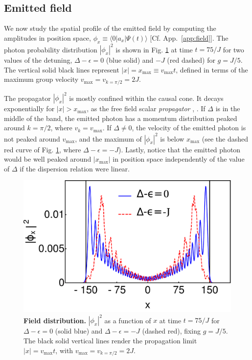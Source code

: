 \documentclass[aps,pra,twocolumn,floatfix,superscriptaddress]{revtex4-1}%
\begin{document}

\subsection{Emitted field}

We now study the spatial profile of the emitted field by computing the amplitudes in position space, $\phi_x\equiv \langle 0|a_x|\Psi(t)\rangle$ [Cf. App.\ \ref{app:field}]. The photon probability distribution $|\phi_x|^2$ is shown in Fig. \ref{fig:w_n} at time $t=75/J$ for two values of the detuning, $\Delta-\epsilon=0$ (blue solid) and $-J$ (red dashed) for $g=J/5$. The vertical solid black lines represent $|x|=x_\text{max}\equiv v_\text{max}t$, defined in terms of the maximum group velocity $v_\text{max}= v_{k=\pi/2}=2J$. 

The propagator $|\phi_x|^2$ is mostly confined within the causal cone. It decays exponentially for $|x|>x_\text{max}$, as the free field scalar {\it propagator} \cite[Sect. 4.5]{Greiner-fq}, \cite[Sect. 2]{Peskin}. If $\Delta$ is in the middle of the band, the emitted photon has a momentum distribution peaked around $k=\pi/2$, where $v_k=v_\text{max}$. {\color{blue}If $\Delta\neq 0$, the velocity of the emitted photon is not peaked around $v_\text{max}$, and the maximum of $|\phi_x|^2$ is below $x_\text{max}$ (see the dashed red curve of Fig. \ref{fig:w_n}, where $\Delta-\epsilon=-J$)}. {\color{blue}Lastly, notice that the emitted photon would be well peaked around $|x_\text{max}|$ in position space independently of the value of $\Delta$ if the dispersion relation were linear.}


\begin{figure}[thb!]
\includegraphics[width=1.0\columnwidth]{wx_g_0_2_Delta_0_-1.pdf}
\caption{{\bf Field distribution.} $|\phi_x|^2$ as a function of $x$ at time $t=75/J$ for $\Delta-\epsilon=0$ (solid blue) and $\Delta-\epsilon=-J$ (dashed red), fixing $g=J/5$. The black solid vertical lines render the propagation limit $|x|=v_\text{max}t$, with $v_\text{max}=v_{k=\pi/2}=2J$.}\label{fig:w_n}
\end{figure}
\end{document}
